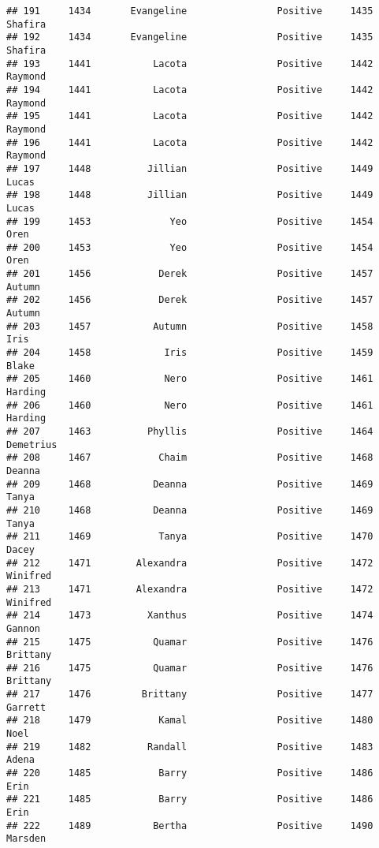\documentclass[
]{article}
\begin{document}
\begin{verbatim}
## 191     1434       Evangeline                Positive     1435          Shafira
## 192     1434       Evangeline                Positive     1435          Shafira
## 193     1441           Lacota                Positive     1442          Raymond
## 194     1441           Lacota                Positive     1442          Raymond
## 195     1441           Lacota                Positive     1442          Raymond
## 196     1441           Lacota                Positive     1442          Raymond
## 197     1448          Jillian                Positive     1449            Lucas
## 198     1448          Jillian                Positive     1449            Lucas
## 199     1453              Yeo                Positive     1454             Oren
## 200     1453              Yeo                Positive     1454             Oren
## 201     1456            Derek                Positive     1457           Autumn
## 202     1456            Derek                Positive     1457           Autumn
## 203     1457           Autumn                Positive     1458             Iris
## 204     1458             Iris                Positive     1459            Blake
## 205     1460             Nero                Positive     1461          Harding
## 206     1460             Nero                Positive     1461          Harding
## 207     1463          Phyllis                Positive     1464        Demetrius
## 208     1467            Chaim                Positive     1468           Deanna
## 209     1468           Deanna                Positive     1469            Tanya
## 210     1468           Deanna                Positive     1469            Tanya
## 211     1469            Tanya                Positive     1470            Dacey
## 212     1471        Alexandra                Positive     1472         Winifred
## 213     1471        Alexandra                Positive     1472         Winifred
## 214     1473          Xanthus                Positive     1474           Gannon
## 215     1475           Quamar                Positive     1476         Brittany
## 216     1475           Quamar                Positive     1476         Brittany
## 217     1476         Brittany                Positive     1477          Garrett
## 218     1479            Kamal                Positive     1480             Noel
## 219     1482          Randall                Positive     1483            Adena
## 220     1485            Barry                Positive     1486             Erin
## 221     1485            Barry                Positive     1486             Erin
## 222     1489           Bertha                Positive     1490          Marsden

\end{verbatim}
\end{document}
